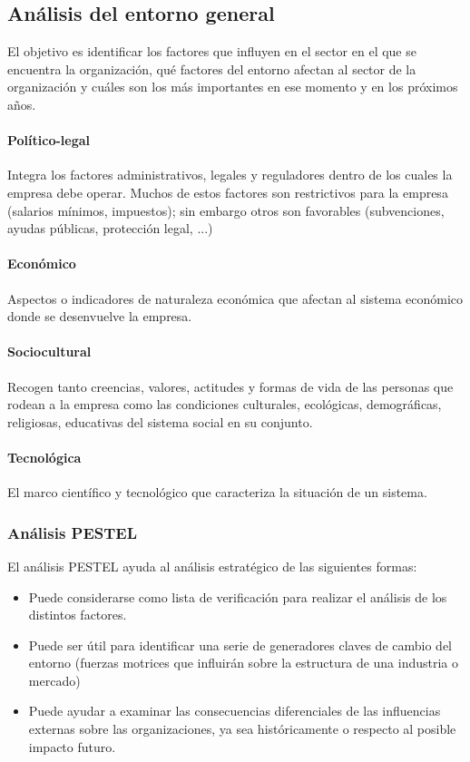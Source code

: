 \documentclass[12pt]{article}
\theoremstyle{definition_wo_parentheses}
\begin{document}
\subsection{Análisis del entorno general}

El objetivo es identificar los factores que influyen en el sector en el que se encuentra la organización, qué factores del entorno afectan al sector de la organización y cuáles son los más importantes en ese momento y en los próximos años.

\paragraph{Político-legal} Integra los factores administrativos, legales y reguladores dentro de los cuales la empresa debe operar. Muchos de estos factores son restrictivos para la empresa (salarios mínimos, impuestos); sin embargo otros son favorables (subvenciones, ayudas públicas, protección legal, ...)

\paragraph{Económico} Aspectos o indicadores de naturaleza económica que afectan al sistema económico donde se desenvuelve la empresa.

\paragraph{Sociocultural} Recogen tanto creencias, valores, actitudes y formas de vida de las personas que rodean a la empresa como las condiciones culturales, ecológicas, demográficas, religiosas, educativas del sistema social en su conjunto.

\paragraph{Tecnológica} El marco científico y tecnológico que caracteriza la situación de un sistema.

\subsubsection{Análisis PESTEL}

El análisis PESTEL ayuda al análisis estratégico de las siguientes formas: 

\begin{itemize}
\item Puede considerarse como lista de verificación para realizar el análisis de los distintos factores.
\item Puede ser útil para identificar una serie de generadores claves de cambio del entorno (fuerzas motrices que influirán sobre la estructura de una industria o mercado)
\item Puede ayudar a examinar las consecuencias diferenciales de las influencias externas sobre las organizaciones, ya sea históricamente o respecto al posible impacto futuro.
\end{itemize}
\end{document}
